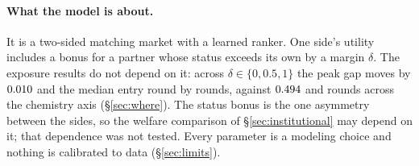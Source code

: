 \paragraph{What the model is about.} It is a two-sided matching market with a
learned ranker. One side's utility includes a bonus for a partner whose status
exceeds its own by a margin $\delta$. The exposure results do not depend on it:
across $\delta \in \{0, 0.5, 1\}$ the peak gap moves
by $0.010$ and the median entry round by \deltaEntrySpread{} rounds,
against $0.494$ and \shockEntrySpread{} rounds across the chemistry
axis (\S\ref{sec:where}). The status bonus is the one asymmetry between the sides, so the welfare
comparison of \S\ref{sec:institutional} may depend on it; that dependence was not
tested.
Every parameter is a modeling choice and nothing is calibrated to data
(\S\ref{sec:limits}).
